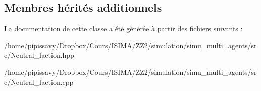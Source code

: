 \subsection*{Membres hérités additionnels}


La documentation de cette classe a été générée à partir des fichiers suivants \-:\begin{DoxyCompactItemize}
\item 
/home/pipissavy/\-Dropbox/\-Cours/\-I\-S\-I\-M\-A/\-Z\-Z2/simulation/simu\-\_\-multi\-\_\-agents/src/Neutral\-\_\-faction.\-hpp\item 
/home/pipissavy/\-Dropbox/\-Cours/\-I\-S\-I\-M\-A/\-Z\-Z2/simulation/simu\-\_\-multi\-\_\-agents/src/Neutral\-\_\-faction.\-cpp\end{DoxyCompactItemize}

